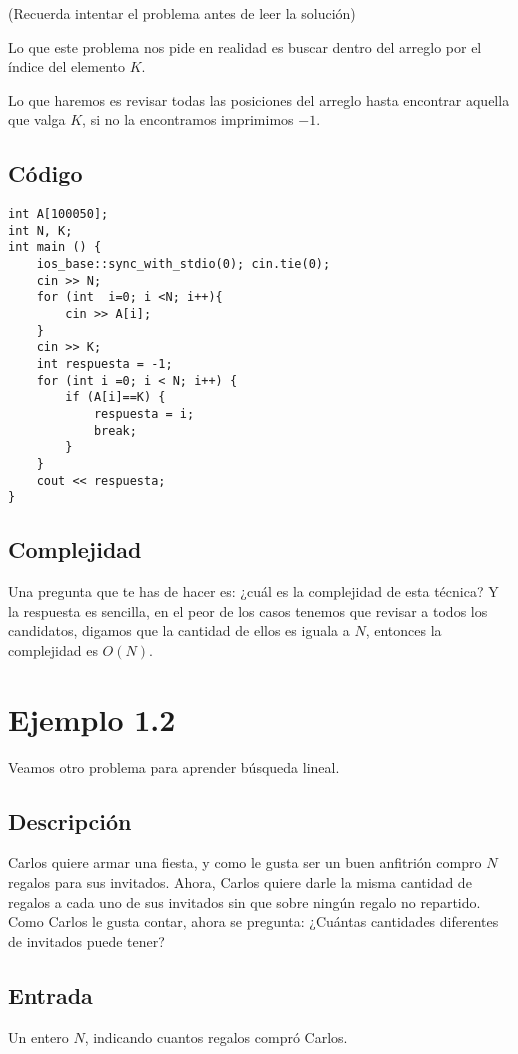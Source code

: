 (Recuerda intentar el problema antes de leer la solución)

Lo que este problema nos pide en realidad es buscar dentro del arreglo por el índice del elemento \(K\).

Lo que haremos es revisar todas las posiciones del arreglo hasta encontrar aquella que valga \(K\), si no la encontramos imprimimos \(-1\).


\subsection*{Código}
\begin{lstlisting}
int A[100050];
int N, K;
int main () {	
	ios_base::sync_with_stdio(0); cin.tie(0);
	cin >> N;
	for (int  i=0; i <N; i++){ 
		cin >> A[i];
	}
	cin >> K;
	int respuesta = -1;
	for (int i =0; i < N; i++) {
		if (A[i]==K) {
			respuesta = i;
			break;
		}
	}
	cout << respuesta;
}
\end{lstlisting}


\subsection*{Complejidad}

Una pregunta que te has de hacer es: ¿cuál es la complejidad de esta técnica? Y la respuesta es sencilla, en el peor de los casos tenemos que revisar a todos los candidatos, digamos que la cantidad de ellos es iguala a \(N\), entonces la complejidad es \(O(N)\).

\section*{Ejemplo 1.2}
Veamos otro problema para aprender búsqueda lineal. 

\subsection*{Descripción}

Carlos quiere armar una fiesta, y como le gusta ser un buen anfitrión compro \(N\) regalos para sus invitados.
Ahora, Carlos quiere darle la misma cantidad de regalos a cada uno de sus invitados sin que sobre ningún regalo no repartido. Como Carlos le gusta contar, ahora se pregunta: ¿Cuántas cantidades diferentes de invitados puede tener?
\subsection*{Entrada}
Un entero \(N\), indicando cuantos regalos compró Carlos.
